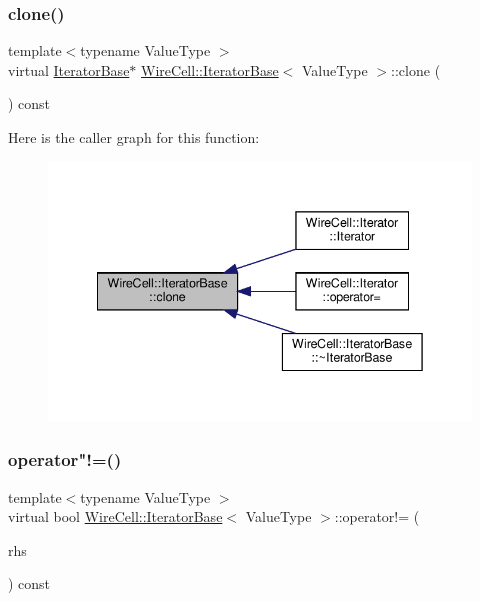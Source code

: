 \subsubsection{\texorpdfstring{clone()}{clone()}}
{\footnotesize\ttfamily template$<$typename Value\+Type $>$ \\
virtual \hyperlink{class_wire_cell_1_1_iterator_base}{Iterator\+Base}$\ast$ \hyperlink{class_wire_cell_1_1_iterator_base}{Wire\+Cell\+::\+Iterator\+Base}$<$ Value\+Type $>$\+::clone (\begin{DoxyParamCaption}{ }\end{DoxyParamCaption}) const\hspace{0.3cm}{\ttfamily [pure virtual]}}

Here is the caller graph for this function\+:
\nopagebreak
\begin{figure}[H]
\begin{center}
\leavevmode
\includegraphics[width=342pt]{class_wire_cell_1_1_iterator_base_a6bb7f1f53c37dc1518291f09f493f2be_icgraph}
\end{center}
\end{figure}
\mbox{\label{class_wire_cell_1_1_iterator_base_a25557feb11a250eb324a33b7114f2f40}} 
\subsubsection{\texorpdfstring{operator"!=()}{operator!=()}}
{\footnotesize\ttfamily template$<$typename Value\+Type $>$ \\
virtual bool \hyperlink{class_wire_cell_1_1_iterator_base}{Wire\+Cell\+::\+Iterator\+Base}$<$ Value\+Type $>$\+::operator!= (\begin{DoxyParamCaption}\item[{const \hyperlink{class_wire_cell_1_1_iterator_base}{Iterator\+Base}$<$ Value\+Type $>$ \&}]{rhs }\end{DoxyParamCaption}) const\hspace{0.3cm}{\ttfamily [pure virtual]}}

